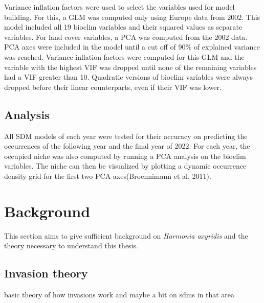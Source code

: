 \documentclass[12pt,a4paper]{article}
\begin{document}
Variance inflation factors were used to select the variables used for model building. 
For this, a GLM was computed only using Europe data from 2002.
This model included all 19 bioclim variables and their squared values as separate variables.
For land cover variables, a PCA was computed from the 2002 data.
PCA axes were included in the model until a cut off of 90\% of explained variance was reached.
Variance inflation factors were computed for this GLM and the variable with the highest VIF was dropped until none of the remaining variables had a VIF greater than 10. Quadratic versions of bioclim variables were always dropped before their linear counterparts, even if their VIF was lower.

\subsection{Analysis}
All SDM models of each year were tested for their accuracy on predicting the occurrences of the following year and the final year of 2022. 
For each year, the occupied niche was also computed by running a PCA analysis on the bioclim variables. The niche can then be visualized by plotting a dynamic occurrence density grid for the first two PCA axes(Broennimann et al. 2011).

\section{Background}
This section aims to give sufficient background on \textit{Harmonia axyridis} and the theory necessary to understand this thesis.

\subsection{Invasion theory}
basic theory of how invasions work and maybe a bit on sdms in that area
\end{document}
